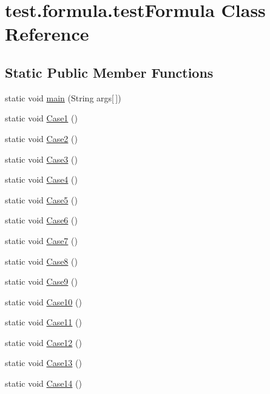 \hypertarget{classtest_1_1formula_1_1test_formula}{}\section{test.\+formula.\+test\+Formula Class Reference}
\label{classtest_1_1formula_1_1test_formula}
\subsection*{Static Public Member Functions}
\begin{DoxyCompactItemize}
\item 
static void \hyperlink{classtest_1_1formula_1_1test_formula_a0823766756f2fb448952b5dfbdbdde35}{main} (String args\mbox{[}$\,$\mbox{]})
\item 
static void \hyperlink{classtest_1_1formula_1_1test_formula_a5117b11ab567adeda46e943611d4c548}{Case1} ()
\item 
static void \hyperlink{classtest_1_1formula_1_1test_formula_a60897f1362d36275f5406d86f43dc47b}{Case2} ()
\item 
static void \hyperlink{classtest_1_1formula_1_1test_formula_a962632b33c9768ee7dccc7bc073104a2}{Case3} ()
\item 
static void \hyperlink{classtest_1_1formula_1_1test_formula_ae93a1b466e9de19ddaf385b2021a5d1b}{Case4} ()
\item 
static void \hyperlink{classtest_1_1formula_1_1test_formula_a201777560b70aa7ca5a70f142aad1d5e}{Case5} ()
\item 
static void \hyperlink{classtest_1_1formula_1_1test_formula_a8cdd75658fd181c242208c24d65b46b8}{Case6} ()
\item 
static void \hyperlink{classtest_1_1formula_1_1test_formula_a0032e649945ba8ef75ce6625ed4ceb6c}{Case7} ()
\item 
static void \hyperlink{classtest_1_1formula_1_1test_formula_a6a9c5febf19bdbb834f405bba48ed3e8}{Case8} ()
\item 
static void \hyperlink{classtest_1_1formula_1_1test_formula_ac9a3b6aed2b77f5787bd5020a550307c}{Case9} ()
\item 
static void \hyperlink{classtest_1_1formula_1_1test_formula_aa4118f2bcd087be3ff206270fd472c48}{Case10} ()
\item 
static void \hyperlink{classtest_1_1formula_1_1test_formula_aa8471948eb0a53c064e7ca108f788a0c}{Case11} ()
\item 
static void \hyperlink{classtest_1_1formula_1_1test_formula_a9b4008c53c60476a7d120fd9cabcbcaf}{Case12} ()
\item 
static void \hyperlink{classtest_1_1formula_1_1test_formula_a0299d02b1428144d47b513463968e143}{Case13} ()
\item 
static void \hyperlink{classtest_1_1formula_1_1test_formula_af7d69338eb9008abc8c3837064b8466e}{Case14} ()
\end{DoxyCompactItemize}


